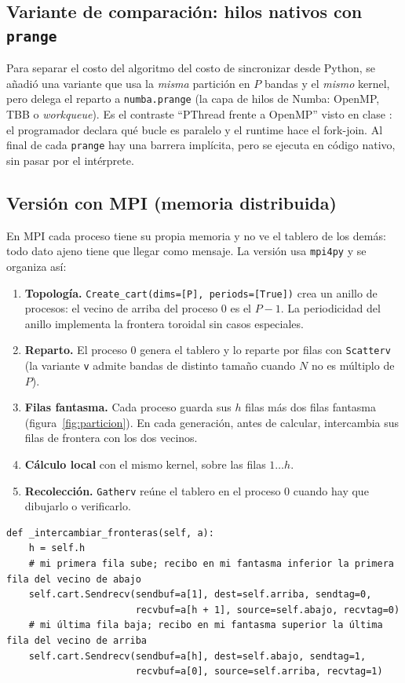 \documentclass[11pt,a4paper]{article}
\newcommand{\code}[1]{\texttt{#1}}
\begin{document}
\subsection{Variante de comparación: hilos nativos con \code{prange}}

Para separar el costo del algoritmo del costo de sincronizar desde Python, se añadió una variante que usa la
\emph{misma} partición en $P$ bandas y el \emph{mismo} kernel, pero delega el reparto a
\code{numba.prange} (la capa de hilos de Numba: OpenMP, TBB o \emph{workqueue}). Es el contraste ``PThread frente a OpenMP'' visto en
clase \cite{pastrana-paralelismo}: el programador declara qué bucle es paralelo y el runtime hace el
fork-join. Al final de cada \code{prange} hay una barrera implícita, pero se ejecuta en código nativo, sin pasar
por el intérprete.

\subsection{Versión con MPI (memoria distribuida)}\label{sec:mpi}

En MPI cada proceso tiene su propia memoria y no ve el tablero de los demás: todo dato ajeno tiene que llegar
como mensaje. La versión usa \code{mpi4py} \cite{mpi4py} y se organiza así:

\begin{enumerate}
  \item \textbf{Topología.} \code{Create\_cart(dims=[P], periods=[True])} crea un anillo de procesos:
        el vecino de arriba del proceso 0 es el $P{-}1$. La periodicidad del anillo implementa la frontera
        toroidal sin casos especiales.
  \item \textbf{Reparto.} El proceso 0 genera el tablero y lo reparte por filas con \code{Scatterv}
        (la variante \code{v} admite bandas de distinto tamaño cuando $N$ no es múltiplo de $P$).
  \item \textbf{Filas fantasma.} Cada proceso guarda sus $h$ filas más dos filas fantasma (figura~\ref{fig:particion}).
        En cada generación, antes de calcular, intercambia sus filas de frontera con los dos vecinos.
  \item \textbf{Cálculo local} con el mismo kernel, sobre las filas $1\ldots h$.
  \item \textbf{Recolección.} \code{Gatherv} reúne el tablero en el proceso 0 cuando hay que dibujarlo o verificarlo.
\end{enumerate}

\begin{lstlisting}[caption={Intercambio de filas fantasma (extracto de \code{vida/motor\_mpi.py}).}]
def _intercambiar_fronteras(self, a):
    h = self.h
    # mi primera fila sube; recibo en mi fantasma inferior la primera fila del vecino de abajo
    self.cart.Sendrecv(sendbuf=a[1], dest=self.arriba, sendtag=0,
                       recvbuf=a[h + 1], source=self.abajo, recvtag=0)
    # mi última fila baja; recibo en mi fantasma superior la última fila del vecino de arriba
    self.cart.Sendrecv(sendbuf=a[h], dest=self.abajo, sendtag=1,
                       recvbuf=a[0], source=self.arriba, recvtag=1)
\end{lstlisting}
\end{document}
